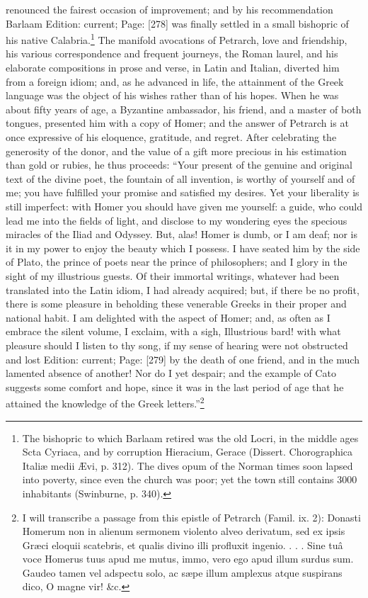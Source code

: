 renounced the fairest occasion of improvement; and by his recommendation Barlaam Edition: current; Page: [278] was finally settled in a small bishopric of his native Calabria.\footnote{The bishopric to which Barlaam retired was the old Locri, in the middle ages Scta Cyriaca, and by corruption Hieracium, Gerace (Dissert. Chorographica Italiæ medii Ævi, p. 312). The dives opum of the Norman times soon lapsed into poverty, since even the church was poor; yet the town still contains 3000 inhabitants (Swinburne, p. 340).} The manifold avocations of Petrarch, love and friendship, his various correspondence and frequent journeys, the Roman laurel, and his elaborate compositions in prose and verse, in Latin and Italian, diverted him from a foreign idiom; and, as he advanced in life, the attainment of the Greek language was the object of his wishes rather than of his hopes. When he was about fifty years of age, a Byzantine ambassador, his friend, and a master of both tongues, presented him with a copy of Homer; and the answer of Petrarch is at once expressive of his eloquence, gratitude, and regret. After celebrating the generosity of the donor, and the value of a gift more precious in his estimation than gold or rubies, he thus proceeds: \texthebrew{“}Your present of the genuine and original text of the divine poet, the fountain of all invention, is worthy of yourself and of me; you have fulfilled your promise and satisfied my desires. Yet your liberality is still imperfect: with Homer you should have given me yourself: a guide, who could lead me into the fields of light, and disclose to my wondering eyes the specious miracles of the Iliad and Odyssey. But, alas! Homer is dumb, or I am deaf; nor is it in my power to enjoy the beauty which I possess. I have seated him by the side of Plato, the prince of poets near the prince of philosophers; and I glory in the sight of my illustrious guests. Of their immortal writings, whatever had been translated into the Latin idiom, I had already acquired; but, if there be no profit, there is some pleasure in beholding these venerable Greeks in their proper and national habit. I am delighted with the aspect of Homer; and, as often as I embrace the silent volume, I exclaim, with a sigh, Illustrious bard! with what pleasure should I listen to thy song, if my sense of hearing were not obstructed and lost Edition: current; Page: [279] by the death of one friend, and in the much lamented absence of another! Nor do I yet despair; and the example of Cato suggests some comfort and hope, since it was in the last period of age that he attained the knowledge of the Greek letters.\texthebrew{}”\footnote{I will transcribe a passage from this epistle of Petrarch (Famil. ix. 2): Donasti Homerum non in alienum sermonem violento alveo derivatum, sed ex ipsis Græci eloquii scatebris, et qualis divino illi profluxit ingenio. . . . Sine tuâ voce Homerus tuus apud me mutus, immo, vero ego apud illum surdus sum. Gaudeo tamen vel adspectu solo, ac sæpe illum amplexus atque suspirans dico, O magne vir! \&c.}

